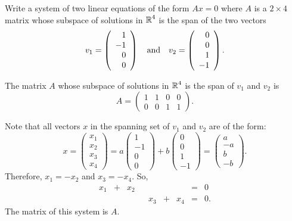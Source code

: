 \documentclass{ximera}
\begin{document}
\begin{exercise} \label{c5.2.3}
Write a system of two linear equations of the form $Ax=0$ where
$A$ is a $2\times 4$ matrix whose subspace of solutions in $\mbox{$\Bbb{R}$}^4$
is the span of the two vectors
\[
v_1 = \left(\begin{array}{r} 1 \\ -1 \\ 0 \\  0 \end{array}\right) \quad\mbox{and}\quad
v_2 = \left(\begin{array}{r} 0 \\  0 \\ 1 \\ -1 \end{array}\right).
\]

\begin{solution}

\ans The matrix $A$ whose subspace of solutions in $\mbox{$\Bbb{R}$}^4$ is the span of
$v_1$ and $v_2$ is
\[
A = \left(\begin{array}{rrrr} 1 & 1 & 0 & 0 \\ 0 & 0 & 1 & 1
\end{array}\right).
\]

\soln Note that all vectors $x$ in the spanning set of $v_1$ and $v_2$
are of the form:
\[
x = \left(\begin{array}{r} x_1 \\ x_2 \\ x_3 \\ x_4
\end{array}\right)
= a\left(\begin{array}{r} 1 \\ -1 \\ 0 \\ 0 \end{array}\right) + 
b\left(\begin{array}{r} 0 \\ 0 \\ 1 \\ -1 \end{array}\right) =
\left(\begin{array}{r} a \\ -a \\ b \\ -b \end{array}\right).
\]
Therefore, $x_1 = -x_2$ and $x_3 = -x_4$.  So,
\[
\begin{array}{rrrrrrrrl}
x_1 & + & x_2 & & & & & = & 0 \\
& & & & x_3 & + & x_4 & = & 0. \end{array}
\]
The matrix of this system is $A$.

\end{solution}
\end{exercise}
\end{document}
